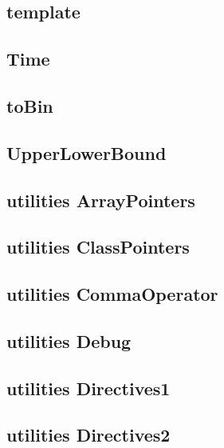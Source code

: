 \subsection{ template}
\raggedbottom
\hrulefill
\subsection{ Time}
\raggedbottom
\hrulefill
\subsection{ toBin}
\raggedbottom
\hrulefill
\subsection{ UpperLowerBound}
\raggedbottom
\hrulefill
\subsection{utilities ArrayPointers}
\raggedbottom
\hrulefill
\subsection{utilities ClassPointers}
\raggedbottom
\hrulefill
\subsection{utilities CommaOperator}
\raggedbottom
\hrulefill
\subsection{utilities Debug}
\raggedbottom
\hrulefill
\subsection{utilities Directives1}
\raggedbottom
\hrulefill
\subsection{utilities Directives2}
\raggedbottom
\hrulefill
